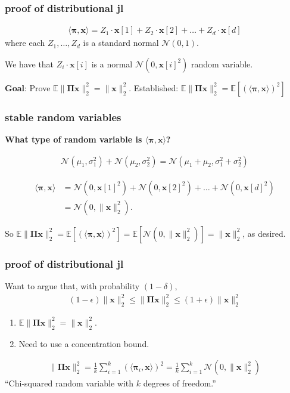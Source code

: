 \documentclass[compress]{beamer}
\newcommand{\bs}[1]{\boldsymbol{#1}}
\newcommand{\bv}[1]{\mathbf{#1}}
\newcommand{\E}{\mathbb{E}}
\begin{document}
\begin{frame}
	\frametitle{proof of distributional jl}	
	\begin{align*}
		\langle\bs{\pi},\bv{x}\rangle = Z_1\cdot\bv{x}[1] + Z_2\cdot\bv{x}[2]  +  \ldots + Z_d\cdot\bv{x}[d]
	\end{align*}
	where each $Z_1, \ldots, Z_d$ is a standard normal $\mathcal{N}(0,1)$. 
	
	We have that $Z_i \cdot\bv{x}[i]$ is a normal $\mathcal{N}(0,\bv{x}[i]^2)$ random variable.
	
	\vspace{5em}
	\begin{block}{\vspace*{-3ex}}
		\small \textbf{Goal}: Prove $\E \|\bs{\Pi} \bv{x} \|_2^2 = \|\bv{x}\|_2^2$. Established: $\E \|\bs{\Pi} \bv{x} \|_2^2 = \E\left[\left(\langle\bs{\pi},\bv{x}\rangle\right)^2 \right]$
	\end{block}
\end{frame}

\begin{frame}[t]
	\frametitle{stable random variables}
	\textbf{What type of random variable is $\langle\bs{\pi},\bv{x}\rangle$?}
	\begin{fact}
		\begin{align*}
			\mathcal{N}(\mu_1, \sigma_1^2) + \mathcal{N}(\mu_2, \sigma_2^2) =  \mathcal{N}(\mu_1 + \mu_2, \sigma_1^2 + \sigma_2^2)
		\end{align*}
	\end{fact}
	\begin{align*}
		\langle\bs{\pi},\bv{x}\rangle &= \mathcal{N}(0,\bv{x}[1]^2) + \mathcal{N}(0,\bv{x}[2]^2) + \ldots + \mathcal{N}(0,\bv{x}[d]^2) \\ &= \mathcal{N}(0,\|\bv{x}\|_2^2). 
	\end{align*}
	
	So $\E \|\bs{\Pi} \bv{x} \|_2^2 = \E\left[\left(\langle\bs{\pi},\bv{x}\rangle\right)^2 \right] = \E\left[\mathcal{N}(0,\|\bv{x}\|_2^2)\right]  = \|\bv{x}\|_2^2$, as desired.
\end{frame}

\begin{frame}
	\frametitle{proof of distributional jl}
	Want to argue that, with probability $(1-\delta)$,
	\begin{align*}
		(1-\epsilon)\|\bv{x}\|_2^2 \leq \|\bs{\Pi}\bv{x}\|_2^2 \leq (1+\epsilon)\|\bv{x}\|_2^2 
	\end{align*}
	
	\begin{enumerate}
		\item $\E \|\bs{\Pi} \bv{x} \|_2^2 = \|\bv{x}\|_2^2$.
		\item Need to use a concentration bound.
	\end{enumerate}
	\begin{align*}
		\|\bs{\Pi} \bv{x} \|_2^2 = \frac{1}{k}\sum_{i=1}^k \left(\langle\bs{\pi}_i,\bv{x}\rangle\right)^2 = \frac{1}{k}\sum_{i=1}^k \mathcal{N}(0,\|\bv{x}\|_2^2)
	\end{align*}
	\alert{``Chi-squared random variable with $k$ degrees of freedom.''}
\end{frame}
\end{document}
